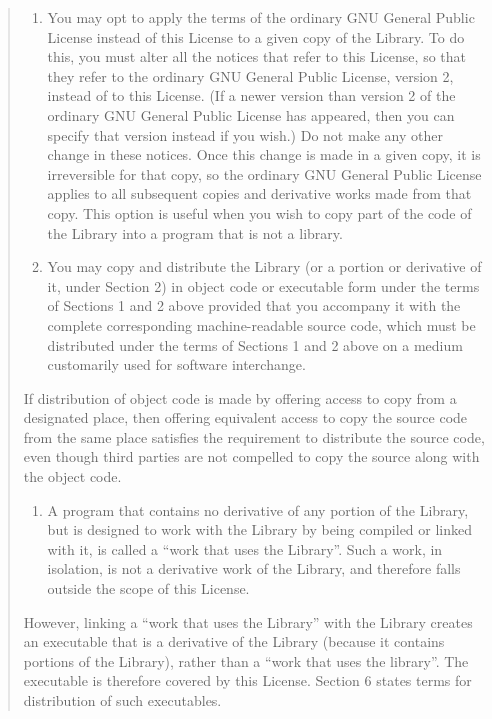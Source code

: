 \documentclass[
]{book}
\providecommand{\tightlist}{%
  \setlength{\itemsep}{0pt}\setlength{\parskip}{0pt}}
\theoremstyle{definition}
\theoremstyle{definition}
\theoremstyle{definition}
\theoremstyle{definition}
\theoremstyle{remark}
\begin{document}
\begin{quote}
\begin{enumerate}
\def\labelenumi{\arabic{enumi}.}
\setcounter{enumi}{2}
\item
  You may opt to apply the terms of the ordinary GNU General
  Public License instead of this License to a given copy of the
  Library. To do this, you must alter all the notices that refer
  to this License, so that they refer to the ordinary GNU General
  Public License, version 2, instead of to this License. (If a
  newer version than version 2 of the ordinary GNU General Public
  License has appeared, then you can specify that version instead
  if you wish.) Do not make any other change in these notices.
  Once this change is made in a given copy, it is irreversible for
  that copy, so the ordinary GNU General Public License applies to
  all subsequent copies and derivative works made from that copy.
  This option is useful when you wish to copy part of the code of
  the Library into a program that is not a library.
\item
  You may copy and distribute the Library (or a portion or
  derivative of it, under Section 2) in object code or executable
  form under the terms of Sections 1 and 2 above provided that you
  accompany it with the complete corresponding machine-readable
  source code, which must be distributed under the terms of
  Sections 1 and 2 above on a medium customarily used for software
  interchange.
\end{enumerate}

If distribution of object code is made by offering access to
copy from a designated place, then offering equivalent access to
copy the source code from the same place satisfies the
requirement to distribute the source code, even though third
parties are not compelled to copy the source along with the
object code.

\begin{enumerate}
\def\labelenumi{\arabic{enumi}.}
\setcounter{enumi}{4}
\tightlist
\item
  A program that contains no derivative of any portion of the
  Library, but is designed to work with the Library by being
  compiled or linked with it, is called a ``work that uses the
  Library''. Such a work, in isolation, is not a derivative work
  of the Library, and therefore falls outside the scope of this
  License.
\end{enumerate}

However, linking a ``work that uses the Library'' with the Library
creates an executable that is a derivative of the Library
(because it contains portions of the Library), rather than a
``work that uses the library''. The executable is therefore
covered by this License. Section 6 states terms for distribution
of such executables.


\end{quote}
\end{document}
